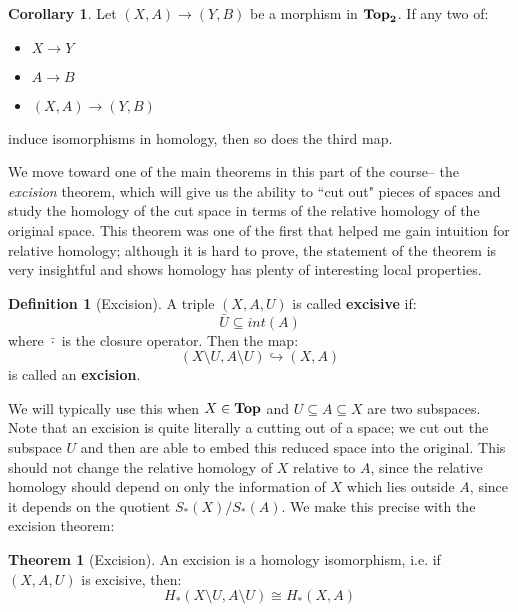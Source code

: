 \documentclass[11pt, oneside]{amsart}   	%
\theoremstyle{definition}
\newtheorem{definition}{Definition}[section]
\newtheorem{theorem}{Theorem}[section]
\newtheorem{corollary}{Corollary}[theorem]
\begin{document}
\begin{corollary}
	Let $(X, A)\rightarrow (Y, B)$ be a morphism in $\bf{Top}_2$. If any two of:
	\begin{itemize}
		\item $X\rightarrow Y$
		\item $A\rightarrow B$
		\item $(X, A)\rightarrow (Y, B)$
	\end{itemize}
	induce isomorphisms in homology, then so does the third map. 
\end{corollary}

We move toward one of the main theorems in this part of the course-- the \textit{excision} theorem, which will give us the 
ability to ``cut out" pieces of spaces and study the homology of the cut space in terms of the relative homology of the 
original space. This theorem was one of the first that helped me gain intuition for relative homology; although it is hard to 
prove, the statement of the theorem is very insightful and shows homology has plenty of interesting local properties. 

\begin{definition}[Excision]
	A triple $(X, A, U)$ is called \textbf{excisive} if:
	\begin{equation}
		\bar U\subseteq int(A)
	\end{equation}
	where $\bar\cdot$ is the closure operator. Then the map:
	\begin{equation}
		(X\setminus U, A\setminus U)\hookrightarrow (X, A)
	\end{equation}
	is called an \textbf{excision}. 
\end{definition}

We will typically use this when $X\in \bf{Top}$ and $U\subseteq A\subseteq X$ are two subspaces. Note that an excision is 
quite literally a cutting out of a space; we cut out the subspace $U$ and then are able to embed this reduced space into the 
original. This should not change the relative homology of $X$ relative to $A$, since the relative homology should depend on 
only the information of $X$ which lies outside $A$, since it depends on the quotient $S_*(X) / S_*(A)$. We make this 
precise with the excision theorem:
\begin{theorem}[Excision]
	An excision is a homology isomorphism, i.e. if $(X, A, U)$ is excisive, then:
	\begin{equation}
		H_*(X\setminus U, A\setminus U)\cong H_*(X, A)
	\end{equation}
\end{theorem}
\end{document}
